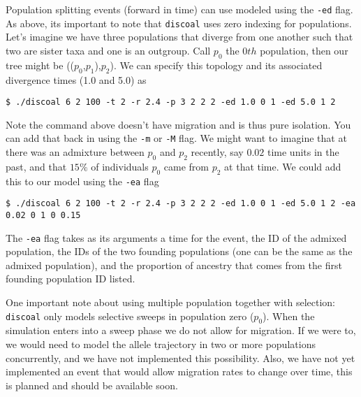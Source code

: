 \documentclass[12pt]{article}
\begin{document}
Population splitting events (forward in time) can use modeled using the \texttt{-ed} flag. As above, its important to note that \texttt{discoal} uses zero indexing for populations. Let's imagine we have three populations that diverge from one another such that two are sister taxa and one is an outgroup. Call $p_0$ the $0th$ population, then our tree might be (($p_0$,$p_1$),$p_2$). We can specify this topology and its associated divergence times (1.0 and 5.0) as
\begin{verbatim}
$ ./discoal 6 2 100 -t 2 -r 2.4 -p 3 2 2 2 -ed 1.0 0 1 -ed 5.0 1 2
\end{verbatim}
Note the command above doesn't have migration and is thus pure isolation. You can add that back in using the \texttt{-m} or \texttt{-M} flag.
We might want to imagine that at there was an admixture between $p_0$ and $p_2$ recently, say $0.02$ time units in the past, and that $15\%$ of individuals $p_0$ came from $p_2$ at that time. We could add this to our model using the \texttt{-ea} flag

\begin{verbatim}
$ ./discoal 6 2 100 -t 2 -r 2.4 -p 3 2 2 2 -ed 1.0 0 1 -ed 5.0 1 2 -ea 0.02 0 1 0 0.15
\end{verbatim}
The \texttt{-ea} flag takes as its arguments a time for the event, the ID of the admixed population, the IDs of the two founding populations (one can be the same as the admixed population), and the proportion of ancestry that comes from the first founding population ID listed. 

One important note about using multiple population together with selection: \texttt{discoal} only models selective sweeps in population zero ($p_0$). When the simulation enters into a sweep phase we do not allow for migration. If we were to, we would need to model the allele trajectory in two or more populations concurrently, and we have not implemented this possibility. Also, we have not yet implemented an event that would allow migration rates to change over time, this is planned and should be available soon. 
\end{document}
